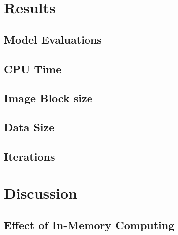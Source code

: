 \documentclass{IEEEtran}
\begin{document}



\section{Results} %
\label{sec:results}


\subsection{Model Evaluations}

\subsection{CPU Time}
% 

\subsection{Image Block size}

\subsection{Data Size}

\subsection{Iterations}


\section{Discussion} %
\label{sec:discussion}
\subsection{Effect of In-Memory Computing}
\end{document}
